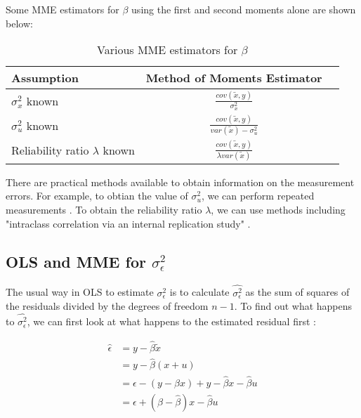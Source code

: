 \documentclass{article}
\begin{document}
Some MME estimators for $\beta$ using the first and second moments alone are shown below:

\begin{table}[ht]
    \centering
    \caption{Various MME estimators for $\beta$}
    \begin{tabular}[t]{lcc}
        \hline
        Assumption&Method of Moments Estimator\\
        \hline
        $\sigma^2_x$ known&$\frac{cov(\tilde{x}, y)}{\sigma^2_x}$\\
        $\sigma^2_u$ known&$\frac{cov(\tilde{x}, y)}{var(\tilde{x}) - \sigma^2_u}$\\
        Reliability ratio $\lambda$ known&$\frac{cov(\tilde{x}, y)}{\lambda var(\tilde{x})}$\\
        \hline
    \end{tabular}
\end{table}%

There are practical methods available to obtain information on the measurement errors. For example, to obtian the value of $\sigma^2_u$, we can perform repeated measurements \cite{mmereport}. To obtain the reliability ratio $\lambda$, we can use methods including "intraclass correlation via an internal replication study" \cite{mmereport}.

\subsection{OLS and MME for $\sigma_\epsilon^2$}

The usual way in OLS to estimate $\sigma_\epsilon^2$ is to calculate $\hat{\sigma^2_\epsilon}$ as the sum of squares of the residuals divided by the degrees of freedom $n-1$.
To find out what happens to $\hat{\sigma^2_\epsilon}$, we can first look at what happens to the estimated residual first \cite{lecturenotes}:

\begin{equation}
    \begin{split}
        \hat{\epsilon}  &= y - \hat{\beta} \tilde{x} \\
                        &= y - \hat{\beta}(x+u) \\
                        &= \epsilon - (y - \beta x) + y - \hat{\beta}x - \hat{\beta}u \\
                        &= \epsilon + (\beta - \hat{\beta})x - \hat{\beta}u
    \end{split} 
\end{equation}
\end{document}
